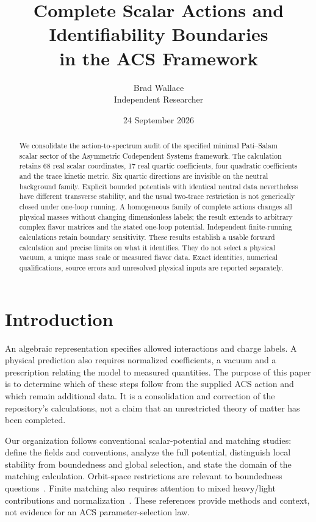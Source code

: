 \documentclass[11pt]{article}
\title{Complete Scalar Actions and Identifiability Boundaries\\in the ACS Framework}
\author{Brad Wallace\\\small Independent Researcher}
\date{24 September 2026}
\begin{document}
\maketitle
\begin{abstract}
We consolidate the action-to-spectrum audit of the specified minimal
Pati--Salam scalar sector of the Asymmetric Codependent Systems framework.
The calculation retains 68 real scalar coordinates, 17 real quartic
coefficients, four quadratic coefficients and the trace kinetic metric.
Six quartic directions are invisible on the neutral background family.
Explicit bounded potentials with identical neutral data nevertheless have
different transverse stability, and the usual two-trace restriction is not
generically closed under one-loop running. A homogeneous family of complete
actions changes all physical masses without changing dimensionless labels;
the result extends to arbitrary complex flavor matrices and the stated
one-loop potential. Independent finite-running calculations retain boundary
sensitivity. These results establish a usable forward calculation and precise
limits on what it identifies. They do not select a physical vacuum, a unique
mass scale or measured flavor data. Exact identities, numerical qualifications,
source errors and unresolved physical inputs are reported separately.
\end{abstract}

\section{Introduction}
An algebraic representation specifies allowed interactions and charge labels.
A physical prediction also requires normalized coefficients, a vacuum and a
prescription relating the model to measured quantities. The purpose of this
paper is to determine which of these steps follow from the supplied ACS
action and which remain additional data. It is a consolidation and correction
of the repository's calculations, not a claim that an unrestricted theory of
matter has been completed.

Our organization follows conventional scalar-potential and matching studies:
define the fields and conventions, analyze the full potential, distinguish
local stability from boundedness and global selection, and state the domain
of the matching calculation. Orbit-space restrictions are relevant to
boundedness questions~\cite{Kannike}. Finite matching also requires attention
to mixed heavy/light contributions and normalization~\cite{Jiang,Gherardi}.
These references provide methods and context, not evidence for an ACS
parameter-selection law.
\end{document}
